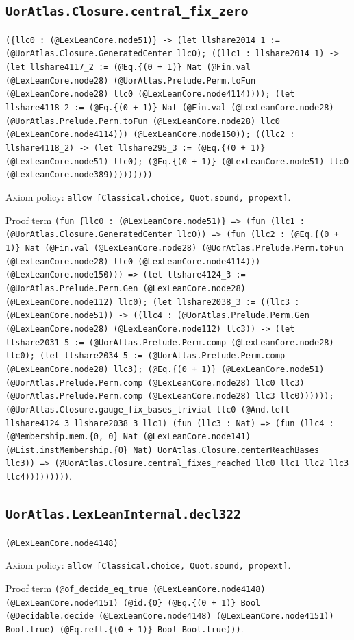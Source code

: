 \documentclass[11pt]{article}
\begin{document}
\subsection*{\texttt{UorAtlas.Closure.central\_fix\_zero}}
\noindent\texttt{(\{llc0 : (@LexLeanCore.node51)\} -> (let llshare2014\_1 := (@UorAtlas.Closure.GeneratedCenter llc0); ((llc1 : llshare2014\_1) -> (let llshare4117\_2 := (@Eq.\{(0 + 1)\} Nat (@Fin.val (@LexLeanCore.node28) (@UorAtlas.Prelude.Perm.toFun (@LexLeanCore.node28) llc0 (@LexLeanCore.node4114)))); (let llshare4118\_2 := (@Eq.\{(0 + 1)\} Nat (@Fin.val (@LexLeanCore.node28) (@UorAtlas.Prelude.Perm.toFun (@LexLeanCore.node28) llc0 (@LexLeanCore.node4114))) (@LexLeanCore.node150)); ((llc2 : llshare4118\_2) -> (let llshare295\_3 := (@Eq.\{(0 + 1)\} (@LexLeanCore.node51) llc0); (@Eq.\{(0 + 1)\} (@LexLeanCore.node51) llc0 (@LexLeanCore.node389)))))))))}\par
\noindent Axiom policy: \texttt{allow [Classical.choice, Quot.sound, propext]}.\par
\noindent Proof term \texttt{(fun \{llc0 : (@LexLeanCore.node51)\} => (fun (llc1 : (@UorAtlas.Closure.GeneratedCenter llc0)) => (fun (llc2 : (@Eq.\{(0 + 1)\} Nat (@Fin.val (@LexLeanCore.node28) (@UorAtlas.Prelude.Perm.toFun (@LexLeanCore.node28) llc0 (@LexLeanCore.node4114))) (@LexLeanCore.node150))) => (let llshare4124\_3 := (@UorAtlas.Prelude.Perm.Gen (@LexLeanCore.node28) (@LexLeanCore.node112) llc0); (let llshare2038\_3 := ((llc3 : (@LexLeanCore.node51)) -> ((llc4 : (@UorAtlas.Prelude.Perm.Gen (@LexLeanCore.node28) (@LexLeanCore.node112) llc3)) -> (let llshare2031\_5 := (@UorAtlas.Prelude.Perm.comp (@LexLeanCore.node28) llc0); (let llshare2034\_5 := (@UorAtlas.Prelude.Perm.comp (@LexLeanCore.node28) llc3); (@Eq.\{(0 + 1)\} (@LexLeanCore.node51) (@UorAtlas.Prelude.Perm.comp (@LexLeanCore.node28) llc0 llc3) (@UorAtlas.Prelude.Perm.comp (@LexLeanCore.node28) llc3 llc0)))))); (@UorAtlas.Closure.gauge\_fix\_bases\_trivial llc0 (@And.left llshare4124\_3 llshare2038\_3 llc1) (fun (llc3 : Nat) => (fun (llc4 : (@Membership.mem.\{0, 0\} Nat (@LexLeanCore.node141) (@List.instMembership.\{0\} Nat) UorAtlas.Closure.centerReachBases llc3)) => (@UorAtlas.Closure.central\_fixes\_reached llc0 llc1 llc2 llc3 llc4)))))))))}.\par
\subsection*{\texttt{UorAtlas.LexLeanInternal.decl322}}
\noindent\texttt{(@LexLeanCore.node4148)}\par
\noindent Axiom policy: \texttt{allow [Classical.choice, Quot.sound, propext]}.\par
\noindent Proof term \texttt{(@of\_decide\_eq\_true (@LexLeanCore.node4148) (@LexLeanCore.node4151) (@id.\{0\} (@Eq.\{(0 + 1)\} Bool (@Decidable.decide (@LexLeanCore.node4148) (@LexLeanCore.node4151)) Bool.true) (@Eq.refl.\{(0 + 1)\} Bool Bool.true)))}.\par
\end{document}
